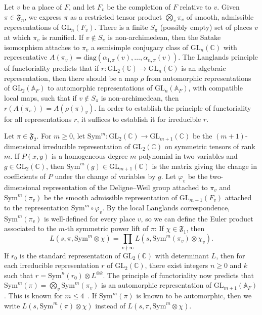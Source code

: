 \documentclass[11pt]{amsart}
\theoremstyle{remark}
\newcommand{\Sym}{\mathrm{Sym}}
\newcommand{\GL}{\mathrm{GL}}
\newcommand{\CC}{\mathbb{C}}
\newcommand{\fF}{\mathfrak{F}}
\numberwithin{equation}{section}
\begin{document}
Let $v$ be a place of $F$, and let $F_v$ be the completion of $F$ relative to $v$.  Given $\pi\in\mathfrak{F}_{n}$, we express $\pi$ as a restricted tensor product $\bigotimes_v\pi_v$ of smooth, admissible representations of $\mathrm{GL}_n(F_v)$.  There is a finite $S_{\pi}$ (possibly empty) set of places $v$ at which $\pi_v$ is ramified.  If $v\notin S_{\pi}$ is non-archimedean, then the Satake isomorphism attaches to $\pi_v$ a semisimple conjugacy class of $\GL_n(\CC)$ with representative $A(\pi_v)=\mathrm{diag}(\alpha_{1,\pi}(v),\ldots,\alpha_{n,\pi}(v))$.  The Langlands principle of functoriality predicts that if $r\colon \GL_2(\CC)\to \GL_n(\CC)$ is an algebraic representation, then there should be a map $\rho$ from automorphic representations of $\GL_2(\mathbb{A}_F)$ to automorphic representations of $\GL_n(\mathbb{A}_F)$, with compatible local maps, such that if $v\notin S_{\pi}$ is non-archimedean, then $r(A(\pi_v))=A(\rho(\pi)_v)$.  In order to establish the principle of functoriality for all representations $r$, it suffices to establish it for irreducible $r$.

Let $\pi \in \fF_2$.  For $m\geq 0$, let $\mathrm{Sym}^m\colon \mathrm{GL}_2(\mathbb{C})\to\mathrm{GL}_{m+1}(\mathbb{C})$ be the $(m+1)$-dimensional irreducible representation of $\mathrm{GL}_2(\mathbb{C})$ on symmetric tensors of rank $m$.  If $P(x,y)$ is a homogeneous degree $m$ polynomial in two variables and $g\in\mathrm{GL}_2(\mathbb{C})$, then $\mathrm{Sym}^m(g)\in\mathrm{GL}_{m+1}(\mathbb{C})$ is the matrix giving the change in coefficients of $P$ under the change of variables by $g$.  Let $\varphi_v$ be the two-dimensional representation of the Deligne--Weil group attached to $\pi_v$ and $\mathrm{Sym}^m(\pi_v)$ be the smooth admissible representation of $\mathrm{GL}_{m+1}(F_v)$ attached to the representation $\mathrm{Sym}^m\circ \varphi_v$.  By the local Langlands correspondence, $\mathrm{Sym}^m(\pi_v)$ is well-defined for every place $v$, so we can define the Euler product associated to the $m$-th symmetric power lift of $\pi$:  If $\chi\in\mathfrak{F}_1$, then
\[
L(s,\pi,\mathrm{Sym}^m\otimes\chi) = \prod_{v\nmid\infty} L(s,\mathrm{Sym}^m(\pi_v)\otimes\chi_v).
\]
If $r_0$ is the standard representation of $\GL_2(\CC)$ with determinant $L$, then for each irreducible representation $r$ of $\GL_2(\CC)$, there exist integers $n\geq 0$ and $k$ such that $r=\Sym^n(r_0)\otimes L^{\otimes k}$.  The principle of functoriality now predicts that $\mathrm{Sym}^m(\pi) = \bigotimes_v \mathrm{Sym}^m(\pi_v)$ is an automorphic representation of $\mathrm{GL}_{m+1}(\mathbb{A}_F)$.  This is known for $m\leq 4$~\cite{GJ,Kim,KimShahidi}.  If $\mathrm{Sym}^m(\pi)$ is known to be automorphic, then we write $L(s,\mathrm{Sym}^m(\pi)\otimes\chi)$ instead of $L(s,\pi,\mathrm{Sym}^m\otimes\chi)$.
\end{document}

